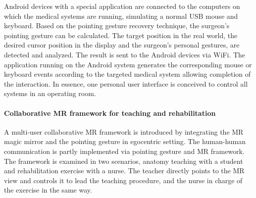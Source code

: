 Android devices with a special application are connected to the computers on which the medical systems are running, simulating a normal USB mouse and keyboard. 
Based on the pointing gesture recovery technique, the surgeon's pointing gesture can be calculated. The target position in the real world, the desired cursor position in the display and the surgeon's personal gestures, are detected and analyzed. The result is sent to the Android devices via WiFi. The application running on the Android system generates the corresponding mouse or keyboard events according to the targeted medical system allowing completion of the interaction. In essence, one personal user interface is conceived to control all systems in an operating room.

\paragraph{Collaborative MR framework for teaching and rehabilitation}
A multi-user collaborative MR framework is introduced by integrating the MR magic mirror and the pointing gesture in egocentric setting.
The human-human communication is partly implemented via pointing gesture and MR framework. %
The framework is examined in two scenarios, anatomy teaching with a student and rehabilitation exercise with a nurse. The teacher directly points to the MR view and controls it to lead the teaching procedure, and the nurse in charge of the exercise in the same way.


